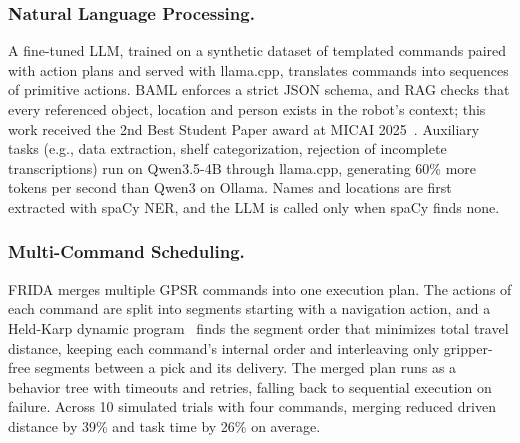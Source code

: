 \subsubsection{Natural Language Processing.} A fine-tuned LLM, trained on a synthetic dataset of templated commands paired with action plans and served with llama.cpp, translates commands into sequences of primitive actions. BAML enforces a strict JSON schema, and RAG checks that every referenced object, location and person exists in the robot's context; this work received the 2nd Best Student Paper award at MICAI 2025~\cite{10.1007/978-3-032-09037-9_24}. Auxiliary tasks (e.g., data extraction, shelf categorization, rejection of incomplete transcriptions) run on Qwen3.5-4B through llama.cpp, generating 60\% more tokens per second than Qwen3 on Ollama. Names and locations are first extracted with spaCy NER, and the LLM is called only when spaCy finds none.



\subsubsection{Multi-Command Scheduling.}\label{sec:scheduling} FRIDA merges multiple GPSR commands into one execution plan. The actions of each command are split into segments starting with a navigation action, and a Held-Karp dynamic program~\cite{held1962dynamic} finds the segment order that minimizes total travel distance, keeping each command's internal order and interleaving only gripper-free segments between a pick and its delivery. The merged plan runs as a behavior tree with timeouts and retries, falling back to sequential execution on failure. Across 10 simulated trials with four commands, merging reduced driven distance by 39\% and task time by 26\% on average.

